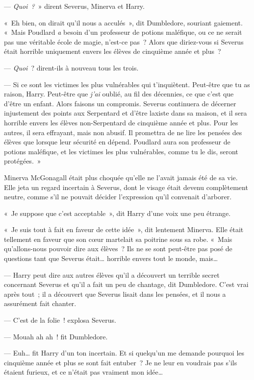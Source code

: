 --- \emph{Quoi~?}~» dirent Severus, Minerva et Harry.

«~Eh bien, on dirait qu'il nous a acculés~», dit Dumbledore, souriant gaiement.
«~Mais Poudlard \emph{a} besoin d'un professeur de potions maléfique, ou ce ne serait pas une véritable école de magie, n'est-ce pas~?
Alors que diriez-vous si Severus était horrible uniquement envers les élèves de cinquième année et plus~?

--- \emph{Quoi}~? dirent-ils à nouveau tous les trois.

--- Si ce sont les victimes les plus vulnérables qui t'inquiètent.
Peut-être que tu as raison, Harry.
Peut-être que \emph{j'ai} oublié, au fil des décennies, ce que c'est que d'être un enfant.
Alors faisons un compromis.
Severus continuera de décerner injustement des points aux Serpentard et d'être laxiste dans sa maison, et il sera horrible envers les élèves non-Serpentard de cinquième année et plus.
Pour les autres, il sera effrayant, mais non abusif.
Il promettra de ne lire les pensées des élèves que lorsque leur sécurité en dépend.
Poudlard aura son professeur de potions maléfique, et les victimes les plus vulnérables, comme tu le dis, seront protégées.~»

Minerva McGonagall était plus choquée qu'elle ne l'avait jamais été de sa vie.
Elle jeta un regard incertain à Severus, dont le visage était devenu complètement neutre, comme s'il ne pouvait décider l'expression qu'il convenait d'arborer.

«~Je suppose que c'est acceptable~», dit Harry d'une voix une peu étrange.

«~Je suis tout à fait en faveur de cette idée~», dit lentement Minerva.
Elle était tellement en faveur que son cœur martelait sa poitrine sous sa robe.
«~Mais qu'allons-nous pouvoir dire aux élèves~?
Ils ne se sont peut-être pas posé de questions tant que Severus était… horrible envers tout le monde, mais…

--- Harry peut dire aux autres élèves qu'il a découvert un terrible secret concernant Severus et qu'il a fait un peu de chantage, dit Dumbledore.
C'est vrai après tout~; il a découvert que Severus lisait dans les pensées, et il nous a assurément fait chanter.

--- C'est de la folie~! explosa Severus.

--- Mouah ah ah~! fit Dumbledore.

--- Euh… fit Harry d'un ton incertain.
Et si quelqu'un me demande pourquoi les cinquième année et plus se sont fait entuber~?
Je ne leur en voudrais pas s'ils étaient furieux, et ce n'était pas vraiment mon idée…

